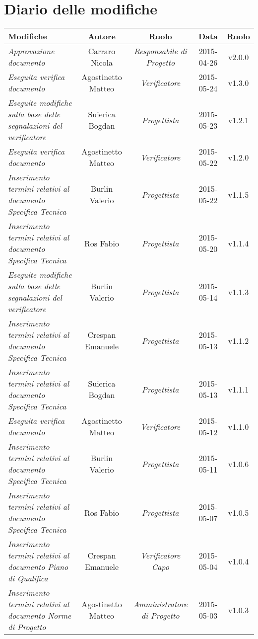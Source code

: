 \newpage
\section*{Diario delle modifiche}

\begin{table}[h]
\centering
\begin{tabular}{|p{}|c|c|c|c|}
	\toprule
		\textbf{Modifiche} & \textbf{Autore} & \textbf{Ruolo} & \textbf{Data} & \textbf{Ruolo} \\
	\midrule
	\midrule
		\textit{Approvazione documento} & Carraro Nicola & \textit{Responsabile di Progetto} & 2015-04-26 & v2.0.0 \\
	\midrule
		\textit{Eseguita verifica documento} & Agostinetto Matteo & \textit{Verificatore} & 2015-05-24 & v1.3.0 \\
	\midrule
		\textit{Eseguite modifiche sulla base delle segnalazioni del verificatore} & Suierica Bogdan & \textit{Progettista} & 2015-05-23 & v1.2.1 \\
	\midrule
		\textit{Eseguita verifica documento} & Agostinetto Matteo & \textit{Verificatore} & 2015-05-22 & v1.2.0 \\
	\midrule
		\textit{Inserimento termini relativi al documento Specifica Tecnica} & Burlin Valerio & \textit{Progettista} & 2015-05-22 & v1.1.5 \\
	\midrule
		\textit{Inserimento termini relativi al documento Specifica Tecnica} & Ros Fabio & \textit{Progettista} & 2015-05-20 & v1.1.4 \\
	\midrule
		\textit{Eseguite modifiche sulla base delle segnalazioni del verificatore} & Burlin Valerio & \textit{Progettista} & 2015-05-14 & v1.1.3 \\
	\midrule
		\textit{Inserimento termini relativi al documento Specifica Tecnica} & Crespan Emanuele & \textit{Progettista} & 2015-05-13 & v1.1.2 \\
	\midrule
		\textit{Inserimento termini relativi al documento Specifica Tecnica} & Suierica Bogdan & \textit{Progettista} & 2015-05-13 & v1.1.1 \\
	\midrule
		\textit{Eseguita verifica documento} & Agostinetto Matteo & \textit{Verificatore} & 2015-05-12 & v1.1.0 \\
	\midrule
		\textit{Inserimento termini relativi al documento Specifica Tecnica} & Burlin Valerio & \textit{Progettista} & 2015-05-11 & v1.0.6 \\
	\midrule
		\textit{Inserimento termini relativi al documento Specifica Tecnica} & Ros Fabio & \textit{Progettista} & 2015-05-07 & v1.0.5 \\
	\midrule
		\textit{Inserimento termini relativi al documento Piano di Qualifica} & Crespan Emanuele & \textit{Verificatore Capo} & 2015-05-04 & v1.0.4 \\
	\midrule
		\textit{Inserimento termini relativi al documento Norme di Progetto} & Agostinetto Matteo & \textit{Amministratore di Progetto} & 2015-05-03 & v1.0.3 \\
	\bottomrule
\end{tabular}	
\end{table}

